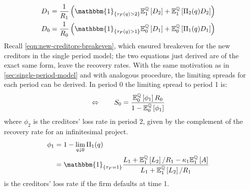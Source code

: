 \documentclass[main.tex]{subfiles}
\begin{document}
        \begin{align}
            D_{1} 
            &= 
            \frac{1}{R_{1}} 
            \left(
                \mathbbm{1}_{\{\tau_{F}(q) > 2\}} 
                \mathbb{E}_{1}^{\rnmeasure}\left[D_{2}\right] 
                +
                \mathbb{E}_{1}^{\rnmeasure}\left[\Pi_{2}(q)D_{2}\right] 
            \right) \\
            D_{0} 
            &= 
            \frac{1}{R_{0}} 
            \left(
                \mathbbm{1}_{\{\tau_{F}(q) > 1\}} 
                \mathbb{E}_{0}^{\rnmeasure}\left[D_{1}\right] 
                +
                \mathbb{E}_{0}^{\rnmeasure}\left[\Pi_{1}(q)D_{1}\right] 
            \right)
        \label{eqn:new-creditors-breakeven-two-period-model}
        \end{align}
        Recall \cref{eqn:new-creditors-breakeven}, 
        which ensured breakeven for the new creditors in the single period model;
        the two equations just derived are of the exact same form, leave the recovery rates. 
        With the same motivation as in \cref{sec:single-period-model} and with analogous procedure,
        the limiting spreads for each period can be derived.
        In period 0 the limiting spread to period 1 is:
        \begin{equation}
            \Leftrightarrow \qquad
            S_0 =
            \frac{
                \mathbb{E}_{0}^{\mathbb{Q}}\left[\phi_1\right]R_0
            }{
                1 - \mathbb{E}_{0}^{\mathbb{Q}}\left[\phi_1\right] 
            }
        \end{equation}
        where $\phi_{2}$ is the creditors' loss rate in period 2,
        given by the complement of the recovery rate for an infinitesimal project.
        \begin{align}
            \phi_1 
            &=
            1 - \lim_{q\downarrow0} \Pi_{1}(q) \\
            &=
            \mathbbm{1}_{\{\tau_{F}=1\}}
            \frac{
                L_{1}
                +
                \mathbb{E}_{1}^{\rnmeasure}\left[L_{2}\right]/R_1 
                - 
                \kappa_{1}\mathbb{E}_{1}^{\rnmeasure}\left[A\right]
            }{
                L_{1} + \mathbb{E}_{1}^{\rnmeasure}\left[L_{2}\right]/R_1
            }
        \end{align}
        is the creditors' loss rate if the firm defaults at time 1.
        
\end{document}
